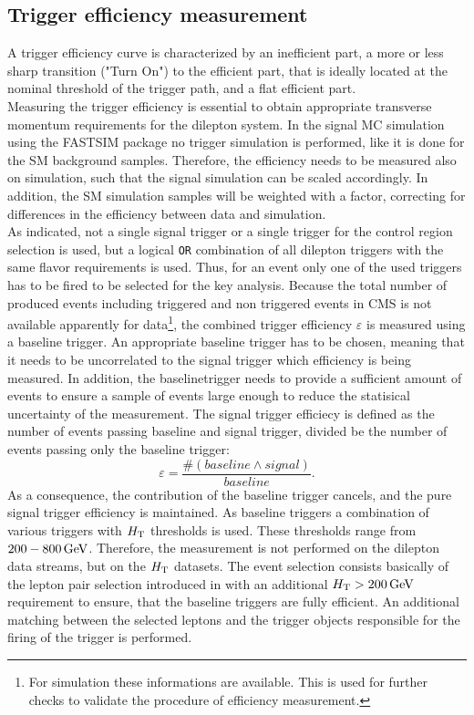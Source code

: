\subsection{Trigger efficiency measurement}
A trigger efficiency curve is characterized by an inefficient part, a more or less sharp transition ("Turn On") to the efficient part, that is ideally located at the nominal threshold of the trigger path, and a flat efficient part.\\
Measuring the trigger efficiency is essential to obtain appropriate transverse momentum requirements for the dilepton system. In the signal MC simulation using the \textsc{FASTSIM} package no trigger simulation is performed, like it is done for the SM background samples. Therefore, the efficiency needs to be measured also on simulation, such that the signal simulation can be scaled accordingly. In addition, the SM simulation samples will be weighted with a factor, correcting for differences in the efficiency between data and simulation.\\
As indicated, not a single signal trigger or a single trigger for the control region selection is used, but a logical \texttt{OR} combination of all dilepton triggers with the same flavor requirements is used. Thus, for an event only one of the used triggers has to be fired to be selected for the key analysis. Because the total number of produced events including triggered and non triggered events in CMS is not available apparently for data\footnote{For simulation these informations are available. This is used for further checks to validate the procedure of efficiency measurement.}, the combined trigger efficiency $\varepsilon$ is measured using a baseline trigger. An appropriate baseline trigger has to be chosen, meaning that it needs to be uncorrelated to the signal trigger which efficiency is being measured. In addition, the baselinetrigger needs to provide a sufficient amount of events to ensure a sample of events large enough to reduce the statisical uncertainty of the measurement. The signal trigger efficiecy is defined as the number of events passing baseline and signal trigger, divided be the number of events passing only the baseline trigger:
\begin{equation}
 \varepsilon=\frac{\#(baseline \wedge signal)}{baseline}.
\end{equation}
As a consequence, the contribution of the baseline trigger cancels, and the pure signal trigger efficiency is maintained. As baseline triggers a combination of various triggers with $H_{\mathrm{T}}$ thresholds is used. These thresholds range from $200-800\,\text{Ge\hspace{-.08em}V}$. Therefore, the measurement is not performed on the dilepton data streams, but on the $H_{\mathrm{T}}$ datasets. The event selection consists basically of the lepton pair selection introduced in  with an additional $H_{\mathrm{T}}>200\,\text{Ge\hspace{-.08em}V}$ requirement to ensure, that the baseline triggers are fully efficient. An additional matching between the selected leptons and the trigger objects responsible for the firing of the trigger is performed.\\
